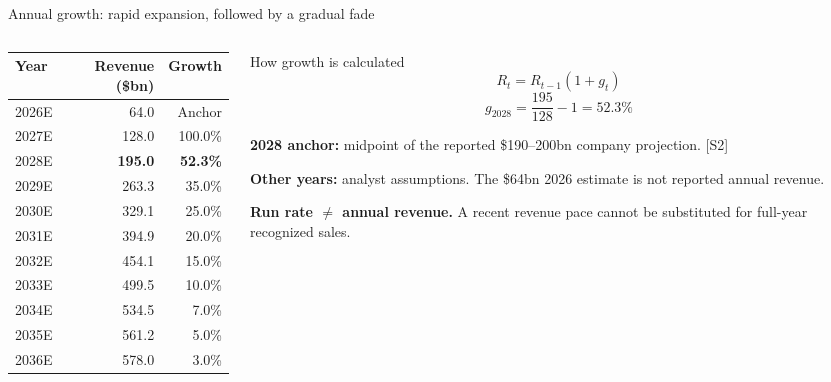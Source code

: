 \documentclass[aspectratio=169,11pt]{beamer}
\begin{document}
\begin{frame}{Annual growth: rapid expansion, followed by a gradual fade}
  \begin{columns}[T,onlytextwidth]
    \begin{column}{0.52\textwidth}
      \small
      \begin{tabular}{@{}lrr@{}}
        \toprule
        Year & Revenue (\$bn) & Growth\\
        \midrule
        2026E & 64.0 & Anchor\\
        2027E & 128.0 & 100.0\%\\
        2028E & \textbf{195.0} & \textbf{52.3\%}\\
        2029E & 263.3 & 35.0\%\\
        2030E & 329.1 & 25.0\%\\
        2031E & 394.9 & 20.0\%\\
        2032E & 454.1 & 15.0\%\\
        2033E & 499.5 & 10.0\%\\
        2034E & 534.5 & 7.0\%\\
        2035E & 561.2 & 5.0\%\\
        2036E & 578.0 & 3.0\%\\
        \bottomrule
      \end{tabular}
    \end{column}
    \begin{column}{0.44\textwidth}
      \begin{block}{How growth is calculated}
        \[
          R_t=R_{t-1}(1+g_t)
        \]
        \[
          g_{2028}=\frac{195}{128}-1=52.3\%
        \]
      \end{block}
      \small
      \textbf{2028 anchor:} midpoint of the reported \$190--200bn company projection. [S2]
      \vspace{0.2cm}

      \textbf{Other years:} analyst assumptions. The \$64bn 2026 estimate is not reported annual revenue.
      \vspace{0.2cm}

      \textbf{Run rate $\ne$ annual revenue.} A recent revenue pace cannot be substituted for full-year recognized sales.
    \end{column}
  \end{columns}
\end{frame}
\end{document}
